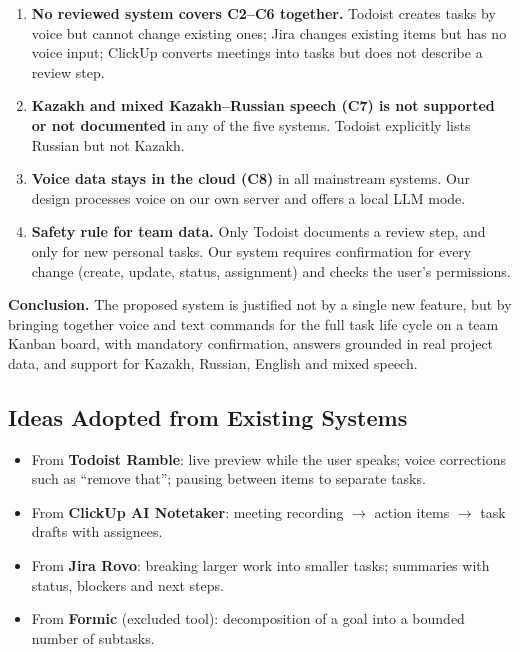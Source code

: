 \documentclass[11pt,a4paper]{article}
\begin{document}
\begin{enumerate}
  \item \textbf{No reviewed system covers C2--C6 together.} Todoist creates tasks by voice but cannot change existing ones; Jira changes existing items but has no voice input; ClickUp converts meetings into tasks but does not describe a review step.
  \item \textbf{Kazakh and mixed Kazakh--Russian speech (C7) is not supported or not documented} in any of the five systems. Todoist explicitly lists Russian but not Kazakh.
  \item \textbf{Voice data stays in the cloud (C8)} in all mainstream systems. Our design processes voice on our own server and offers a local LLM mode.
  \item \textbf{Safety rule for team data.} Only Todoist documents a review step, and only for new personal tasks. Our system requires confirmation for every change (create, update, status, assignment) and checks the user's permissions.
\end{enumerate}

\textbf{Conclusion.} The proposed system is justified not by a single new feature, but by bringing together voice and text commands for the full task life cycle on a team Kanban board, with mandatory confirmation, answers grounded in real project data, and support for Kazakh, Russian, English and mixed speech.

\subsection{Ideas Adopted from Existing Systems}

\begin{itemize}
  \item From \textbf{Todoist Ramble}: live preview while the user speaks; voice corrections such as ``remove that''; pausing between items to separate tasks.
  \item From \textbf{ClickUp AI Notetaker}: meeting recording $\rightarrow$ action items $\rightarrow$ task drafts with assignees.
  \item From \textbf{Jira Rovo}: breaking larger work into smaller tasks; summaries with status, blockers and next steps.
  \item From \textbf{Formic} (excluded tool): decomposition of a goal into a bounded number of subtasks.
\end{itemize}

\end{document}
